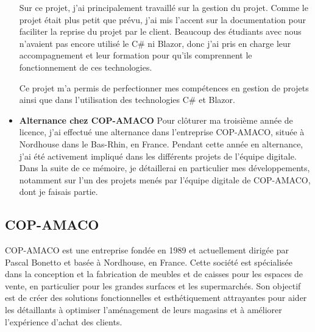 \documentclass[12pt]{article}
\begin{document}
\begin{itemize}
        \newline  Sur ce projet, j'ai principalement travaillé sur la gestion du projet. Comme le projet était plus petit que prévu, j'ai mis l'accent sur la documentation pour faciliter la reprise du projet par le client. Beaucoup des étudiants avec nous n'avaient pas encore utilisé le C\# ni Blazor, donc j'ai pris en charge leur accompagnement et leur formation pour qu'ils comprennent le fonctionnement de ces technologies.

        \newline Ce projet m'a permis de perfectionner mes compétences en gestion de projets ainsi que dans l'utilisation des technologies C\# et Blazor.

    \item \textbf{Alternance chez COP-AMACO}
         \newline Pour clôturer ma troisième année de licence, j'ai effectué une alternance dans l'entreprise COP-AMACO, située à Nordhouse dans le Bas-Rhin, en France. Pendant cette année en alternance, j'ai été activement impliqué dans les différents projets de l'équipe digitale. Dans la suite de ce mémoire, je détaillerai en particulier mes développements, notamment sur l'un des projets menés par l'équipe digitale de COP-AMACO, dont je faisais partie.
\end{itemize} 

\subsection{COP-AMACO}
\justify
\text
COP-AMACO est une entreprise fondée en 1989 et actuellement dirigée par  Pascal Bonetto et basée à Nordhouse, en France. Cette société est spécialisée dans la conception et la fabrication de meubles et de caisses pour les espaces de vente, en particulier pour les grandes surfaces et les supermarchés. Son objectif est de créer des solutions fonctionnelles et esthétiquement attrayantes pour aider les détaillants à optimiser l'aménagement de leurs magasins et à améliorer l'expérience d'achat des clients.
\end{document}
